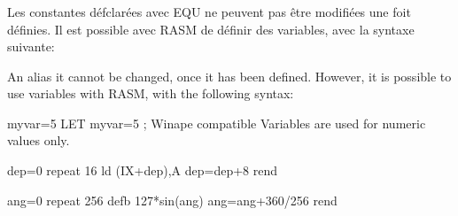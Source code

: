 \subsubsection{}
\begin{xfr}
Les constantes défclarées avec EQU ne peuvent pas être modifiées une foit définies.
Il est possible avec RASM de définir des variables, avec la syntaxe suivante:
\end{xfr}

\begin{xen}
An alias it cannot be changed, once it has been defined.
However, it is possible to use variables with RASM, with the following syntax:
\end{xen}

\begin{code}
myvar=5
LET myvar=5 		; Winape compatible Variables are used for numeric values only.
\end{code}


\begin{code}
  dep=0
  repeat 16
    ld (IX+dep),A
    dep=dep+8
  rend
\end{code}

\begin{code}
  ang=0
  repeat 256
    defb 127*sin(ang)
    ang=ang+360/256
  rend
\end{code}

\subsection{}

